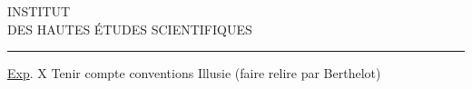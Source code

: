 \begin{center}
INSTITUT\\
DES HAUTES ÉTUDES SCIENTIFIQUES\\[-.4ex]
\rule{1.4cm}{.4pt}
\end{center}

\uline{Exp}. X \qquad Tenir compte conventions  Illusie (faire relire par Berthelot)

